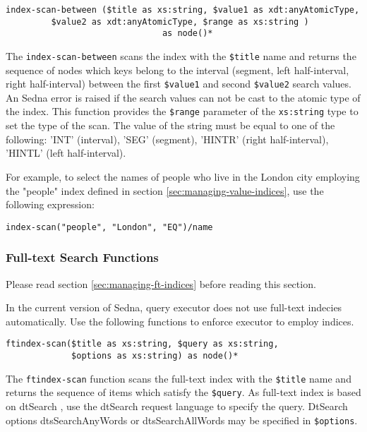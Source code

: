 \documentclass[a4paper,12pt]{article}
\begin{document}
\begin{verbatim}
index-scan-between ($title as xs:string, $value1 as xdt:anyAtomicType,
         $value2 as xdt:anyAtomicType, $range as xs:string )
                               as node()*
\end{verbatim}

The \verb!index-scan-between! scans the index with the \verb!$title! name and
returns the sequence of nodes which keys belong to the interval (segment, left
half-interval, right half-interval) between the first \verb!$value1! and second
\verb!$value2! search values. An Sedna error is raised if the search values can
not be cast to the atomic type of the index. This function provides the
\verb!$range! parameter of the \verb!xs:string! type to set the type of the
scan. The value of the string must be equal to one of the following: 
'INT' (interval), 'SEG' (segment), 'HINTR' (right half-interval), 
'HINTL' (left half-interval).

For example, to select the names of people who live in the London city employing
the "people" index defined in section \ref{sec:managing-value-indices}, 
use the following expression:

\begin{verbatim}
index-scan("people", "London", "EQ")/name
\end{verbatim}



\subsubsection{Full-text Search Functions}
\label{sec:ft-fun}
Please read section \ref{sec:managing-ft-indices} before reading this section.

In the current version of Sedna, query executor does not use full-text indecies automatically. Use the following functions
to enforce executor to employ indices.

\begin{verbatim}
ftindex-scan($title as xs:string, $query as xs:string,
             $options as xs:string) as node()*
\end{verbatim}

The \verb!ftindex-scan! function scans the full-text index with the \verb!$title! name and returns the sequence of items which satisfy the \verb!$query!. As full-text index is based on dtSearch \cite{link:dtsearch-engine}, use the dtSearch request language \cite{doc:dtsearch} to specify the query.
DtSearch options dtsSearchAnyWords or dtsSearchAllWords may be specified in \verb!$options!.
\end{document}
